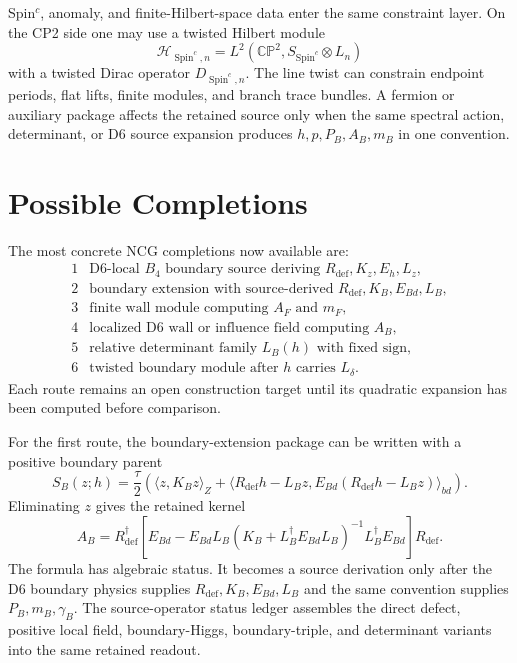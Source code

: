 \documentclass[11pt]{article}
\newcommand{\CP}{\mathbb{CP}}
\newcommand{\Spin}{\operatorname{Spin}}
\begin{document}
Spin\(^c\), anomaly, and finite-Hilbert-space data enter the same constraint
layer.  On the CP2 side one may use a twisted Hilbert module
\[
  \mathcal H_{\Spin^c,n}
    =L^2(\CP^2,S_{\Spin^c}\otimes L_n)
\]
with a twisted Dirac operator \(D_{\Spin^c,n}\).  The line twist can constrain
endpoint periods, flat lifts, finite modules, and branch trace bundles.  A
fermion or auxiliary package affects the retained source only when the same
spectral action, determinant, or D6 source expansion produces
\(h,p,P_B,A_B,m_B\) in one convention.

\section{Possible Completions}

The most concrete NCG completions now available are:
\[
\begin{array}{ll}
1 & \text{D6-local }B_4\text{ boundary source deriving }R_{\mathrm{def}},K_z,E_h,L_z,\\
2 & \text{boundary extension with source-derived }R_{\mathrm{def}},K_B,E_{Bd},L_B,\\
3 & \text{finite wall module computing }A_F\text{ and }m_F,\\
4 & \text{localized D6 wall or influence field computing }A_B,\\
5 & \text{relative determinant family }L_B(h)\text{ with fixed sign},\\
6 & \text{twisted boundary module after }h\text{ carries }L_\delta.
\end{array}
\]
Each route remains an open construction target until its quadratic expansion
has been computed before comparison.

For the first route, the boundary-extension package can be written with a
positive boundary parent
\[
  S_B(z;h)=\frac{\tau}{2}\left(
    \langle z,K_Bz\rangle_Z+
    \langle R_{\mathrm{def}}h-L_Bz,
      E_{Bd}(R_{\mathrm{def}}h-L_Bz)\rangle_{bd}
  \right).
\]
Eliminating \(z\) gives the retained kernel
\[
  A_B=R_{\mathrm{def}}^\dagger
  \left[
    E_{Bd}
    -E_{Bd}L_B(K_B+L_B^\dagger E_{Bd}L_B)^{-1}
      L_B^\dagger E_{Bd}
  \right]R_{\mathrm{def}}.
\]
The formula has algebraic status.  It becomes a source derivation only after
the D6 boundary physics supplies \(R_{\mathrm{def}},K_B,E_{Bd},L_B\) and the
same convention supplies \(P_B,m_B,\gamma_B\).
The source-operator status ledger \cite{ncg-b4-source-operator-ledger}
assembles the direct defect, positive local field, boundary-Higgs,
boundary-triple, and determinant variants into the same retained readout.
\end{document}
